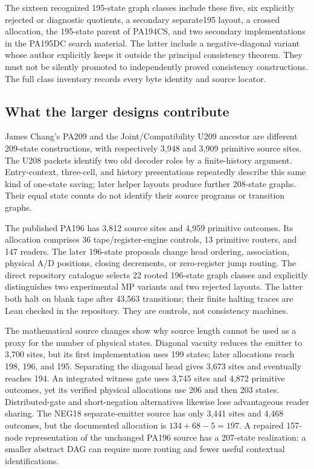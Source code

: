 The sixteen recognized 195-state graph classes include these five, six
explicitly rejected or diagnostic quotients, a secondary separate195
layout, a crossed allocation, the 195-state parent of PA194CS, and two
secondary implementations in the PA195DC search material. The latter
include a negative-diagonal variant whose author explicitly keeps it
outside the principal consistency theorem. They must not be silently
promoted to independently proved consistency constructions. The full
class inventory records every byte identity and source locator.

\subsection{What the larger designs contribute}

James Chang's PA209 and the Joint/Compatibility U209 ancestor are different
209-state constructions, with respectively 3,948 and 3,909 primitive
source sites. The U208 packets identify two old decoder roles by a
finite-history argument. Entry-context, three-cell, and history
presentations repeatedly describe this same kind of one-state saving;
later helper layouts produce further 208-state graphs. Their equal
state counts do not identify their source programs or transition graphs.

The published PA196 has 3,812 source sites and 4,959 primitive outcomes.
Its allocation comprises 36 tape/register-engine controls, 13 primitive
routers, and 147 readers. The later 196-state proposals change head
ordering, association, physical A/D positions, closing decrements, or
zero-register jump routing. The direct repository catalogue selects
22 rooted 196-state graph classes and explicitly distinguishes two
experimental MP variants and two rejected layouts. The latter both
halt on blank tape after 43,563 transitions; their finite halting traces
are Lean checked in the repository. They are controls, not consistency
machines.

The mathematical source changes show why source length cannot be used
as a proxy for the number of physical states. Diagonal vacuity reduces
the emitter to 3,700 sites, but its first implementation uses 199 states;
later allocations reach 198, 196, and 195. Separating the diagonal head
gives 3,673 sites and eventually reaches 194. An integrated witness gate
uses 3,745 sites and 4,872 primitive outcomes, yet its verified physical
allocations use 206 and then 203 states. Distributed-gate and
short-negation alternatives likewise lose advantageous reader sharing.
The NEG18 separate-emitter source has only 3,441 sites and 4,468
outcomes, but the documented allocation is $134+68-5=197$.
A repaired 157-node representation of the unchanged PA196 source has
a 207-state realization: a smaller abstract DAG can require more
routing and fewer useful contextual identifications.

